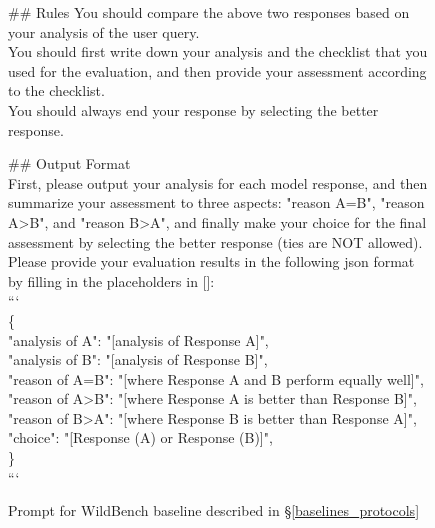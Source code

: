 \begin{figure*}[t!]
\begin{tcolorbox}[colback=black!3!white, colframe=black!70!white, title=WildBench, fontupper=\footnotesize, fonttitle=\footnotesize]
\#\# Rules 
\newline
\newline
You should compare the above two responses based on your analysis of the user query. \\
You should first write down your analysis and the checklist that you used for the evaluation, and then provide your assessment according to the checklist. \\
You should always end your response by selecting the better response. \\
\newline

\#\# Output Format \\

First, please output your analysis for each model response, and then summarize your assessment to three aspects: "reason A=B", "reason A>B", and "reason B>A", and finally make your choice for the final assessment by selecting the better response (ties are NOT allowed). \\
\newline
Please provide your evaluation results in the following json format by filling in the placeholders in []: \\

``` \\
\{ \\
\hspace*{1cm} "analysis of A": "[analysis of Response A]", \\
  \hspace*{1cm}  "analysis of B": "[analysis of Response B]",\\
  \hspace*{1cm}  "reason of A=B": "[where Response A and B perform equally well]", \\
  \hspace*{1cm}  "reason of A>B": "[where Response A is better than Response B]", \\
  \hspace*{1cm}  "reason of B>A": "[where Response B is better than Response A]", \\
  \hspace*{1cm}  "choice": "[Response (A) or Response (B)]", \\
\} \\
```


\end{tcolorbox}
\caption{Prompt for WildBench baseline described in \S\ref{baselines_protocols}}
\label{fig:prompt_wildbench}
\end{figure*}

